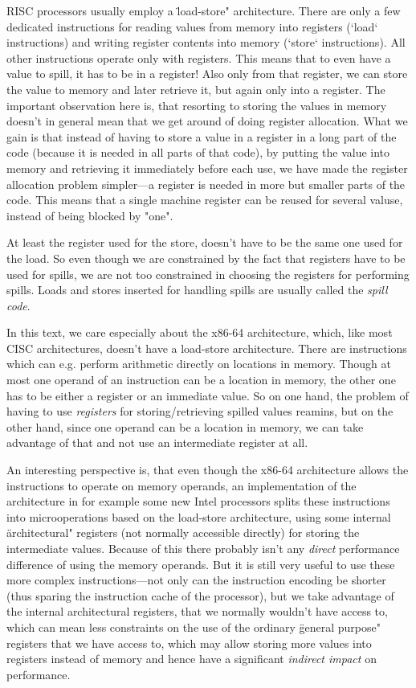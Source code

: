 RISC processors usually employ a \"load-store" architecture. There are only a
few dedicated instructions for reading values from memory into registers (`load`
instructions) and writing register contents into memory (`store` instructions).
All other instructions operate only with registers. This means that to even have
a value to spill, it has to be in a register! Also only from that register, we
can store the value to memory and later retrieve it, but again only into a
register. The important observation here is, that resorting to storing the
values in memory doesn't in general mean that we get around of doing register
allocation. What we gain is that instead of having to store a value in a
register in a long part of the code (because it is needed in all parts of that
code), by putting the value into memory and retrieving it immediately before
each use, we have made the register allocation problem simpler---a register is
needed in more but smaller parts of the code. This means that a single machine
register can be reused for several valuse, instead of being blocked by "one".

At least the register used for the store, doesn't have to be the same one used
for the load. So even though we are constrained by the fact that registers have
to be used for spills, we are not too constrained in choosing the registers for
performing spills. Loads and stores inserted for handling spills are usually
called the {\em spill code}.

In this text, we care especially about the x86-64 architecture, which, like most
CISC architectures, doesn't have a load-store architecture. There are
instructions which can e.g. perform arithmetic directly on locations in memory.
Though at most one operand of an instruction can be a location in memory, the
other one has to be either a register or an immediate value. So on one hand, the
problem of having to use {\em registers} for storing/retrieving
spilled values reamins, but on the other hand, since one operand can be a
location in memory, we can take advantage of that and not use an intermediate
register at all.

An interesting perspective is, that even though the x86-64 architecture allows
the instructions to operate on memory operands, an implementation of the
architecture in for example some new Intel processors splits these instructions
into microoperations based on the load-store architecture, using some internal
\"architectural" registers (not normally accessible directly) for storing the
intermediate values. Because of this there probably isn't any {\em direct}
performance difference of using the memory operands. But it is still very useful
to use these more complex instructions---not only can the instruction encoding
be shorter (thus sparing the instruction cache of the processor), but we take
advantage of the internal architectural registers, that we normally wouldn't
have access to, which can mean less constraints on the use of the ordinary
\"general purpose" registers that we have access to, which may allow storing
more values into registers instead of memory and hence have a significant {\em
indirect impact} on performance.

